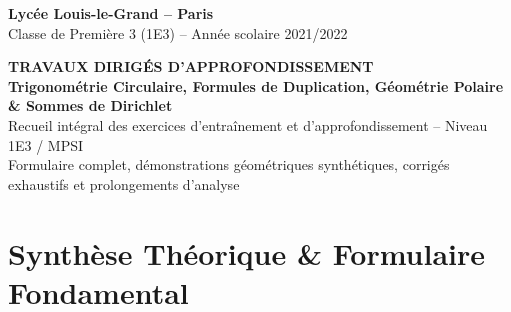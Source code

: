 \documentclass[11pt,a4paper]{article}
\begin{document}
\begin{center}
    {\LARGE \bfseries Lycée Louis-le-Grand -- Paris}\\[0.2cm]
    {\large Classe de Première 3 (1E3) -- Année scolaire 2021/2022}\\[0.3cm]
    \begin{tcolorbox}[colback=llglight,colframe=llgblue,arc=3mm,boxrule=1.2pt,center]
        \begin{center}
            {\Large \bfseries \color{llgblue} TRAVAUX DIRIGÉS D'APPROFONDISSEMENT}\\[0.15cm]
            {\large \bfseries Trigonométrie Circulaire, Formules de Duplication, Géométrie Polaire \& Sommes de Dirichlet}\\[0.2cm]
            \small Recueil intégral des exercices d'entraînement et d'approfondissement -- Niveau 1E3 / MPSI\\[0.1cm]
            \footnotesize Formulaire complet, démonstrations géométriques synthétiques, corrigés exhaustifs et prolongements d'analyse
        \end{center}
    \end{tcolorbox}
\end{center}

\vspace{0.3cm}

\section*{Synthèse Théorique \& Formulaire Fondamental}
\end{document}
